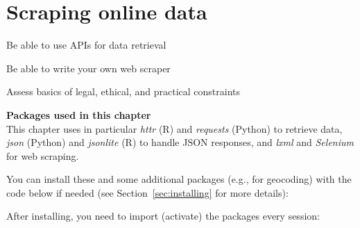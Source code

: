 \chapter{Scraping online data}
\label{chap:scraping}

\begin{abstract}{Abstract}
In this chapter, you learn how to retrieve your data from online sources. We first discuss the use of application programming interfaces, so-called APIs, which allow you to retrieve data from social media platforms, but also government data or other forms of open data, in a machine-readable format. We then discuss how to do web scraping in a narrower sense to retrieve data from websites that do not offer an API. We also discuss how to deal with authentication mechanisms, cookies, and the like, as well as ethical, legal, and practical considerations.
\end{abstract}



\begin{objectives}
\item Be able to use APIs for data retrieval
\item Be able to write your own web scraper
\item Assess basics of legal, ethical, and practical constraints
\end{objectives}


\newpage
\begin{feature}
  \textbf{Packages used in this chapter}\\
  This chapter uses in particular \emph{httr} (R) and \emph{requests} (Python) to retrieve data, \emph{json} (Python) and \emph{jsonlite} (R) to handle JSON responses, and \emph{lxml} and \emph{Selenium} for web scraping.

You can install these and some additional packages (e.g., for geocoding) with the code below if needed  (see Section~\ref{sec:installing} for more details):


\noindent After installing, you need to import (activate) the packages every session:

\end{feature}




